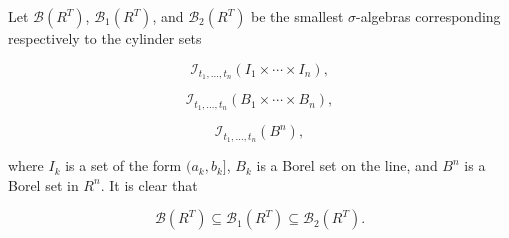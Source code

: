 Let $\mathcal{B}(R^T)$, $\mathcal{B}_1(R^T)$, and $\mathcal{B}_2(R^T)$ be the smallest $\sigma$-algebras corresponding respectively to the cylinder sets

$$\mathcal{I}_{t_1, \ldots, t_n}(I_1 \times \cdots \times I_n),$$

$$\mathcal{I}_{t_1, \ldots, t_n}(B_1 \times \cdots \times B_n),$$

$$\mathcal{I}_{t_1, \ldots, t_n}(B^n),$$

where $I_k$ is a set of the form $(a_k, b_k]$, $B_k$ is a Borel set on the line, and $B^n$ is a Borel set in $R^n$. It is clear that

$$\mathcal{B}(R^T) \subseteq \mathcal{B}_1(R^T) \subseteq \mathcal{B}_2(R^T).$$
